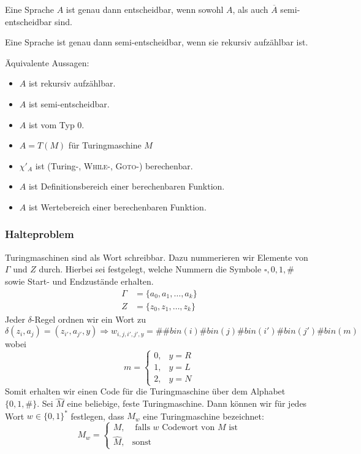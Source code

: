 \documentclass{scrartcl}
\begin{document}

\begin{shaded}
    Eine Sprache $A$ ist genau dann entscheidbar, wenn sowohl $A$, als auch $\overline{A}$ semi-entscheidbar sind.
\end{shaded}
\begin{shaded}
    Eine Sprache ist genau dann semi-entscheidbar, wenn sie rekursiv aufzählbar ist.
\end{shaded}

Äquivalente Aussagen:
\begin{itemize}
    \item $A$ ist rekursiv aufzählbar.
    \item $A$ ist semi-entscheidbar.
    \item $A$ ist vom Typ 0.
    \item $A=T(M)$ für Turingmaschine $M$
    \item $\chi'_A$ ist (Turing-, \textsc{While}-, \textsc{Goto-}) berechenbar.
    \item $A$ ist Definitionsbereich einer berechenbaren Funktion.
    \item $A$ ist Wertebereich einer berechenbaren Funktion.
\end{itemize}

\subsubsection*{Halteproblem}
Turingmaschinen sind als Wort schreibbar. Dazu nummerieren wir Elemente von $\Gamma$ und $Z$ durch. Hierbei sei festgelegt, welche Nummern die Symbole $\square,0,1,\#$ sowie Start- und Endzustände erhalten.
\begin{align*}
\Gamma &= \{a_0,a_1,\dots,a_k\} \\
Z &= \{z_0,z_1,\dots,z_k\}
\end{align*}
Jeder $\delta$-Regel ordnen wir ein Wort zu
\[
\delta(z_i,a_j) = (z_{i'},a_{j'},y)
\Rightarrow w_{i,j,i',j',y} = \#\#bin(i)\#bin(j)\#bin(i')\#bin(j')\#bin(m)
\]
wobei
\[
m=
\begin{cases}
    0, & y=R \\
    1, & y=L \\
    2, & y=N
\end{cases}
\]
Somit erhalten wir einen Code für die Turingmaschine über dem Alphabet $\{0,1,\#\}$. Sei $\hat M$ eine beliebige, feste Turingmaschine. Dann können wir für jedes Wort $w\in\{0,1\}^*$ festlegen, dass $M_w$ eine Turingmaschine bezeichnet:
\[
M_w=
\begin{cases}
    M, &\text{ falls } w \textrm{ Codewort von } M \textrm{ ist}\\
    \hat M, & \textrm{sonst}
\end{cases}
\]
\end{document}
